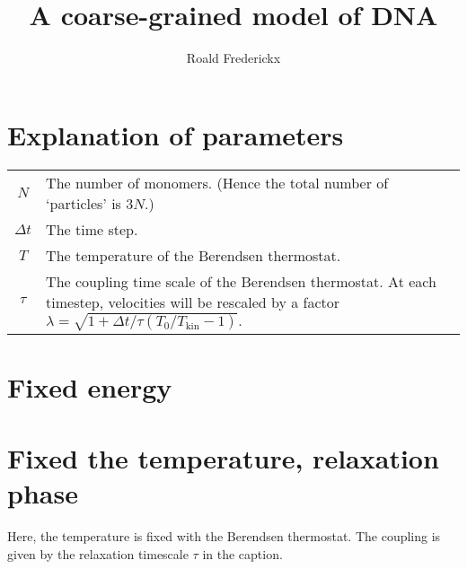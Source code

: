 \documentclass[11pt,a4paper]{article}
\begin{document}
\author{Roald Frederickx}
\title{A coarse-grained model of DNA}
\date{}
\maketitle



\section{Explanation of parameters}
\begin{center}
\begin{tabularx}{\linewidth}{c | X}
$N$&	The number of monomers. (Hence the total number of `particles' is $3N$.)\\[5pt]
$\Delta t$&	The time step.\\[5pt]
$T$&		The temperature of the Berendsen thermostat.\\[5pt]
$\tau$&		The coupling time scale of the Berendsen thermostat. At each timestep, velocities will be rescaled by a factor $\lambda = \sqrt{1 + \Delta t/\tau\left(T_0/T_{\mathrm{kin}} - 1\right)}.$\\[5pt]
\end{tabularx}
\end{center}




\section{Fixed energy}











\FloatBarrier

\section{Fixed the temperature, relaxation phase}
Here, the temperature is fixed with the Berendsen thermostat. The coupling is given by the relaxation timescale $\tau$ in the caption.











\end{document}
